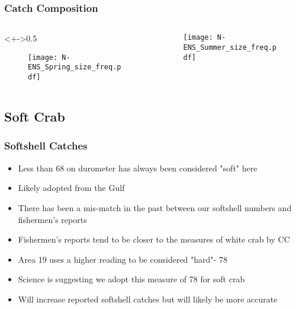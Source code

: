 


\begin{frame}
\frametitle{Catch Composition}

\begin{columns}
\begin{column}<+->{0.5\textwidth}
 \vspace*{-0.5cm}
\begin{figure}
\centerline{\texttt{[image: N-ENS\_Spring\_size\_freq.pdf]}}

\end{figure}
\end{column}

\begin{column}{0.5\textwidth}
\begin{figure}
 \vspace*{-0.5cm}

\centerline{\texttt{[image: N-ENS\_Summer\_size\_freq.pdf]}}

 \end{figure}

\end{column}
\end{columns}


\end{frame}




\subsection{Soft Crab}
\begin{frame}

\frametitle{Softshell Catches}

 \vspace*{-0.5cm}
\begin{block}

\begin{itemize}
\item Less than 68 on durometer has always been considered "soft" here
\item Likely adopted from the Gulf
\item There has been a mis-match in the past between our softshell numbers and fishermen's reports
\item Fishermen's reports tend to be closer to the measures of white crab by CC
\item Area 19 uses a higher reading to be considered "hard"- 78
\item Science is suggesting we adopt this measure of 78 for soft crab
\item Will increase reported softshell catches but will likely be more accurate

\end{itemize}



\end{block}


\end{frame}

